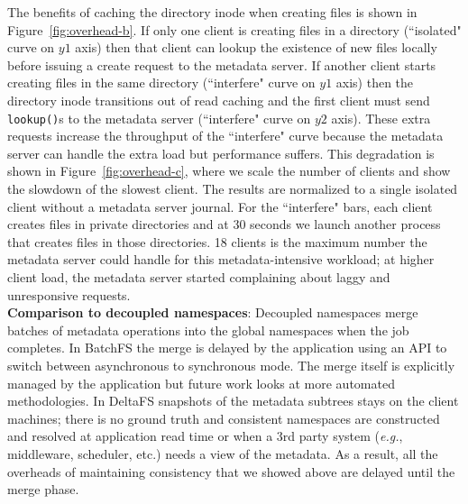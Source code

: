 The benefits of caching the directory inode when creating files is shown in
Figure~\ref{fig:overhead-b}.  If only one client is creating files in a
directory (``isolated" curve on \(y1\) axis) then that client can lookup the
existence of new files locally before issuing a create request to the metadata
server. If another client starts creating files in the same directory
(``interfere" curve on \(y1\) axis) then the directory inode transitions out of
read caching and the first client must send \texttt{lookup()}s to the metadata
server (``interfere" curve on \(y2\) axis). These extra requests increase the
throughput of the ``interfere" curve because the metadata server can handle the
extra load but performance suffers.  This degradation is shown in
Figure~\ref{fig:overhead-c}, where we scale the number of clients and show the
slowdown of the slowest client.  The results are normalized to a single
isolated client without a metadata server journal.  For the ``interfere" bars,
each client creates files in private directories and at 30 seconds we launch
another process that creates files in those directories. 18 clients is the
maximum number the metadata server could handle for this metadata-intensive
workload; at higher client load, the metadata server started complaining about
laggy and unresponsive requests.\\


\noindent\textbf{Comparison to decoupled namespaces}: Decoupled namespaces
merge batches of metadata operations into the global namespaces when the job
completes.  In BatchFS the merge is delayed by the application using an API to
switch between asynchronous to synchronous mode. The merge itself is explicitly
managed by the application but future work looks at more automated
methodologies. In DeltaFS snapshots of the metadata subtrees stays on the client
machines; there is no ground truth and consistent namespaces are constructed
and resolved at application read time or when a 3rd party system ({\it e.g.},
middleware, scheduler, etc.) needs a view of the metadata. As a result, all the
overheads of maintaining consistency that we showed above are delayed until the
merge phase.
